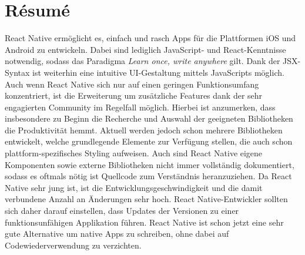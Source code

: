 \section{Résumé}
React Native ermöglicht es, einfach und rasch Apps für die Plattformen iOS und Android zu entwickeln. Dabei sind lediglich JavaScript- und React-Kenntnisse notwendig, sodass das Paradigma \textit{Learn once, write anywhere} gilt. Dank der JSX-Syntax ist weiterhin eine intuitive UI-Gestaltung mittels JavaScripts möglich. Auch wenn React Native sich nur auf einen geringen Funktionsumfang konzentriert, ist die Erweiterung um zusätzliche Features dank der sehr engagierten Community im Regelfall möglich. Hierbei ist anzumerken, dass insbesondere zu Beginn die Recherche und Auswahl der geeigneten Bibliotheken die Produktivität hemmt. Aktuell werden jedoch schon mehrere Bibliotheken entwickelt, welche grundlegende Elemente zur Verfügung stellen, die auch schon plattform-spezifisches Styling aufweisen. Auch sind React Native eigene Komponenten sowie externe Bibliotheken nicht immer vollständig dokumentiert, sodass es oftmals nötig ist Quellcode zum Verständnis heranzuziehen. Da React Native sehr jung ist, ist die Entwicklungsgeschwindigkeit und die damit verbundene Anzahl an Änderungen sehr hoch. React Native-Entwickler sollten sich daher darauf einstellen, dass Updates der Versionen zu einer funktionsunfähigen Applikation führen. 
React Native ist schon jetzt eine sehr gute Alternative um native Apps zu schreiben, ohne dabei auf Codewiederverwendung zu verzichten.